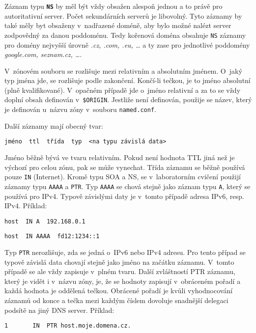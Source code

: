 Záznam typu {\tt\bf NS} by měl být vždy obsažen alespoň jednou a to právě pro autoritativní server. Počet sekundárních serverů je libovolný. Tyto záznamy by také měly byt obsaženy v~nadřazené doméně, aby bylo možné nalézt server zodpovědný za danou poddoménu. Tedy kořenová doména obsahuje {\tt NS} záznamy pro domény nejvyšší úrovně {\em .cz, .com, .eu, \dots} a ty zase pro jednotlivé poddomény {\em google.com, seznam.cz, \dots}.

V~zónovém souboru se rozlišuje mezi relativním a absolutním jménem. O~jaký typ jména jde, se rozlišuje podle zakončení. Končí-li tečkou, je to jméno absolutní (plně kvalifikované). V~opačném případě jde o~jméno relativní a za to se vždy doplní obsah definován v~{\tt \$ORIGIN}. Jestliže není definován, použije se název, který je definován u~názvu zóny v~souboru {\tt named.conf}.

Další záznamy mají obecný tvar:
\begin{verbatim}
jméno  ttl  třída  typ  <na typu závislá data>
\end{verbatim}
Jméno běžně bývá ve tvaru relativním. Pokud není hodnota TTL jiná než je výchozí pro celou zónu, pak se může vynechat. Třída záznamu se běžně používá pouze {\tt IN} (Internet). Kromě typu SOA a NS, se v~laboratorním cvičení použijí záznamy typu {\tt AAAA} a {\tt PTR}. Typ {\tt AAAA} se chová stejně jako záznam typu {\tt A}, který se používá pro IPv4. Typově závislými daty je v~tomto případě adresa IPv6, resp. IPv4. Příklad:
\begin{verbatim}
host  IN A  192.168.0.1
\end{verbatim}
\begin{verbatim}
host  IN AAAA  fd12:1234::1
\end{verbatim}
Typ {\tt PTR} nerozlišuje, zda se jedná o~IPv6 nebo IPv4 adresu. Pro tento případ se typově závislá data chovají stejně jako jméno na začátku záznamu. V~tomto případě se ale vždy zapisuje v~plném tvaru. Další zvláštností PTR záznamu, který je vidět i v~názvu zóny, je, že se hodnoty zapisují v~obráceném pořadí a každá hodnota je oddělená tečkou. Obrácené pořadí je kvůli vyhodnocování záznamů od konce a tečka mezi každým číslem dovoluje snadnější delegaci podsítě na jiný DNS server. Příklad:
\begin{verbatim}
1		IN	PTR	host.moje.domena.cz.
\end{verbatim}

